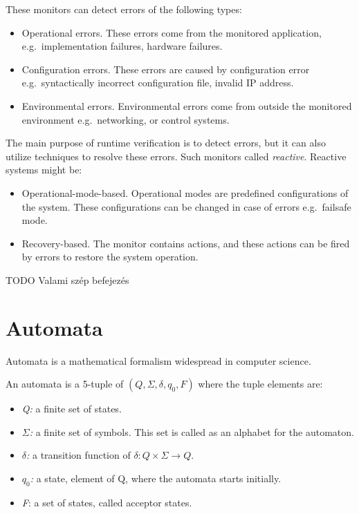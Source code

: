 These monitors can detect errors of the following types:
\begin{itemize}
	\item Operational errors. These errors come from the monitored application, e.g.\ implementation failures, hardware failures.
	\item Configuration errors. These errors are caused by configuration error e.g.\ syntactically incorrect configuration file, invalid IP address.
	\item Environmental errors. Environmental errors come from outside the monitored environment e.g.\ networking, or control systems.
\end{itemize}

The main purpose of runtime verification is to detect errors, but it can also utilize techniques to resolve these errors. Such monitors called \emph{reactive}. Reactive systems might be:
\begin{itemize}
	\item Operational-mode-based. Operational modes are predefined configurations of the system. These configurations can be changed in case of errors e.g.\ failsafe mode.
	\item Recovery-based. The monitor contains actions, and these actions can be fired by errors to restore the system operation.
\end{itemize}

TODO Valami szép befejezés

\section{Automata}
\label{sec:automata}

Automata is a mathematical formalism widespread in computer science.

An automata is a 5-tuple of $(Q, \Sigma, \delta, q_0, F)$ where the tuple elements are:
\begin{itemize}
	\item \emph{Q:} a finite set of states.
	\item \emph{$\Sigma$:} a finite set of symbols. This set is called as an alphabet for the automaton.
	\item \emph{$\delta$:} a transition function of $\delta: Q \times \Sigma \rightarrow Q$.
	\item \emph{$q_0$:} a state, element of Q, where the automata starts initially.
	\item \emph{F}: a set of states, called acceptor states.
\end{itemize}


